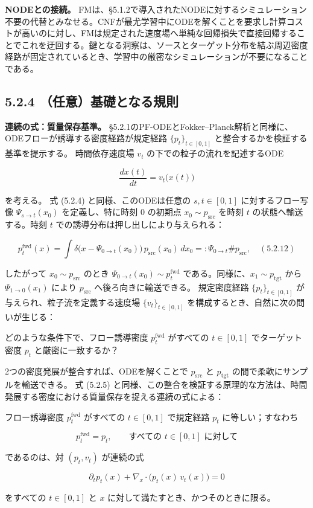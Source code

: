 \textbf{NODEとの接続。} FMは、§5.1.2で導入されたNODEに対するシミュレーション不要の代替とみなせる。CNFが最尤学習中にODEを解くことを要求し計算コストが高いのに対し、FMは規定された速度場へ単純な回帰損失で直接回帰することでこれを迂回する。鍵となる洞察は、ソースとターゲット分布を結ぶ周辺密度経路が固定されているとき、学習中の厳密なシミュレーションが不要になることである。

\subsection*{5.2.4 （任意）基礎となる規則}


\textbf{連続の式：質量保存基準。} §5.2.1のPF-ODEとFokker–Planck解析と同様に、ODEフローが誘導する密度経路が規定経路 $\{p_t\}_{t\in[0,1]}$ と整合するかを検証する基準を提示する。
時間依存速度場 $v_t$ の下での粒子の流れを記述するODE

\[
\frac{dx(t)}{dt}=v_t\bigl(x(t)\bigr)
\]


を考える。
式 (5.2.4) と同様、このODEは任意の $s,t\in[0,1]$ に対するフロー写像 $\Psi_{s\to t}(x_0)$ を定義し、特に時刻 $0$ の初期点 $x_0\sim p_{\mathrm{src}}$ を時刻 $t$ の状態へ輸送する。時刻 $t$ での誘導分布は押し出しにより与えられる：

\[
p_t^{\mathrm{fwd}}(x)=\int \delta\bigl(x-\Psi_{0\to t}(x_0)\bigr)\,p_{\mathrm{src}}(x_0)\,dx_0=:\Psi_{0\to t}\# p_{\mathrm{src}}, \quad (5.2.12)
\]


したがって $x_0\sim p_{\mathrm{src}}$ のとき $\Psi_{0\to t}(x_0)\sim p_t^{\mathrm{fwd}}$ である。同様に、$x_1\sim p_{\mathrm{tgt}}$ から $\Psi_{1\to 0}(x_1)$ により $p_{\mathrm{src}}$ へ後ろ向きに輸送できる。
規定密度経路 $\{p_t\}_{t\in[0,1]}$ が与えられ、粒子流を定義する速度場 $\{v_t\}_{t\in[0,1]}$ を構成するとき、自然に次の問いが生じる：

\begin{propositionbox}[問い 5.2.1]
どのような条件下で、フロー誘導密度 $p_t^{\mathrm{fwd}}$ がすべての $t\in[0,1]$ でターゲット密度 $p_t$ と厳密に一致するか？
\end{propositionbox}


2つの密度発展が整合すれば、ODEを解くことで $p_{\mathrm{src}}$ と $p_{\mathrm{tgt}}$ の間で柔軟にサンプルを輸送できる。
式 (5.2.5) と同様、この整合を検証する原理的な方法は、時間発展する密度における質量保存を捉える連続の式による：

\begin{propositionbox}[定理 5.2.2（質量保存基準）]
フロー誘導密度 $p_t^{\mathrm{fwd}}$ がすべての $t\in[0,1]$ で規定経路 $p_t$ に等しい；すなわち

\[
p_t^{\mathrm{fwd}}=p_t,\qquad\text{すべての }t\in[0,1]\text{ に対して}
\]

であるのは、対 $(p_t,v_t)$ が連続の式

\[
\partial_t p_t(x)+\nabla_x\cdot\bigl(p_t(x)\,v_t(x)\bigr)=0
\]

をすべての $t\in[0,1]$ と $x$ に対して満たすとき、かつそのときに限る。
\end{propositionbox}


